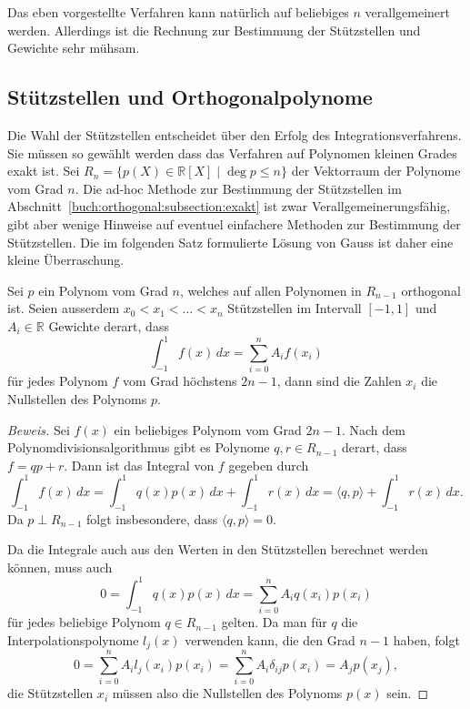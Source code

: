 Das eben vorgestellte Verfahren kann natürlich auf beliebiges $n$
verallgemeinert werden.
Allerdings ist die Rechnung zur Bestimmung der Stützstellen und
Gewichte sehr mühsam.

%
%
\subsection{Stützstellen und Orthogonalpolynome}
Die Wahl der Stützstellen entscheidet über den Erfolg des 
Integrationsverfahrens.
Sie müssen so gewählt werden dass das Verfahren auf Polynomen
kleinen Grades exakt ist.
Sei $R_n=\{p(X)\in\mathbb{R}[X] \mid \deg p\le n\}$ der Vektorraum
der Polynome vom Grad $n$.
Die ad-hoc Methode zur Bestimmung der Stützstellen im
Abschnitt~\ref{buch:orthogonal:subsection:exakt} ist zwar 
Verallgemeinerungsfähig, gibt aber wenige Hinweise auf eventuel
einfachere Methoden zur Bestimmung der Stützstellen.
Die im folgenden Satz formulierte Lösung von Gauss ist
daher eine kleine Überraschung.

\begin{satz}[Gauss]
%
\label{buch:integral:satz:gaussquadratur}
Sei $p$ ein Polynom vom Grad $n$, welches auf allen Polynomen in $R_{n-1}$
orthogonal ist.
Seien ausserdem $x_0<x_1<\dots<x_n$ Stützstellen im Intervall $[-1,1]$ 
und $A_i\in\mathbb{R}$ Gewichte derart, dass
\[
\int_{-1}^1 f(x)\,dx =
\sum_{i=0}^n A_if(x_i)
\]
für jedes Polynom $f$ vom Grad höchstens $2n-1$, dann sind die Zahlen
$x_i$ die Nullstellen des Polynoms $p$.
\end{satz}

\begin{proof}[Beweis]
Sei $f(x)$ ein beliebiges Polynom vom Grad $2n-1$.
Nach dem Polynomdivisionsalgorithmus gibt es
Polynome $q,r\in R_{n-1}$ derart, dass $f=qp+r$.
Dann ist das Integral von $f$ gegeben durch
\[
\int_{-1}^1 f(x)\,dx
=
\int_{-1}^1q(x) p(x)\,dx + \int_{-1}^1 r(x)\,dx
=
\langle q,p\rangle + \int_{-1}^1 r(x)\,dx.
\]
Da $p\perp R_{n-1}$ folgt insbesondere, dass $\langle q,p\rangle=0$.

Da die Integrale auch aus den Werten in den Stützstellen berechnet
werden können, muss auch
\[
0
=
\int_{-1}^1 q(x)p(x)\,dx
=
\sum_{i=0}^n A_iq(x_i)p(x_i)
\]
für jedes beliebige Polynom $q\in R_{n-1}$ gelten.
Da man für $q$ die Interpolationspolynome $l_j(x)$ verwenden
kann, die den Grad $n-1$ haben, folgt
\[
0
=
\sum_{i=0}^n
A_il_j(x_i)p(x_i)
=
\sum_{i=0}^n A_i\delta_{ij}p(x_i)
=
A_jp(x_j),
\]
die Stützstellen $x_i$ müssen also die Nullstellen des Polynoms
$p(x)$ sein.
\end{proof}


